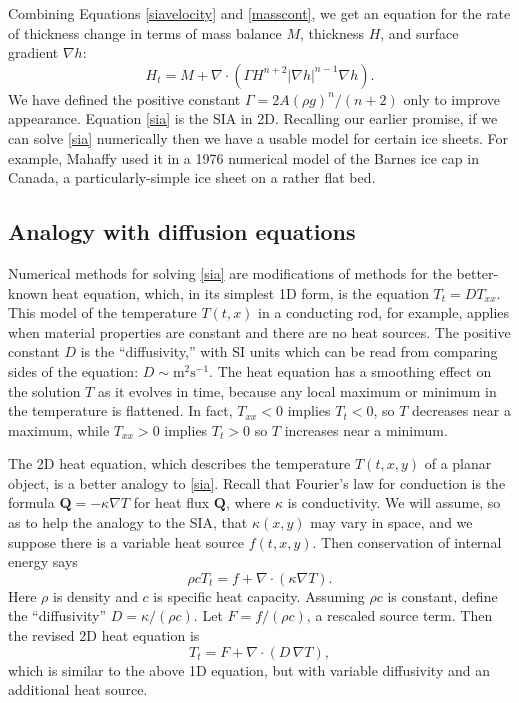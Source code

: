 \documentclass[letterpaper,final,12pt,reqno]{amsart}
\newcommand{\grad}{\nabla}
\newcommand{\Div}{\nabla\cdot}
\begin{document}
Combining Equations \eqref{siavelocity} and \eqref{masscont}, we get an equation for the rate of thickness change in terms of mass balance $M$, thickness $H$, and surface gradient $\grad h$:
\begin{equation}
H_t = M + \Div \left(\Gamma H^{n+2} |\grad h|^{n-1} \grad h \right). \label{sia}
\end{equation}
We have defined the positive constant $\Gamma = 2 A (\rho g)^n / (n+2)$ only to improve appearance.  Equation \eqref{sia} is the SIA in 2D.  Recalling our earlier promise, if we can solve \eqref{sia} numerically then we have a usable model for certain ice sheets.  For example, Mahaffy \cite{Mahaffy} used it in a 1976 numerical model of the Barnes ice cap in Canada, a particularly-simple ice sheet on a rather flat bed.

\subsection*{Analogy with diffusion equations}  Numerical methods for solving \eqref{sia} are modifications of methods for the better-known heat equation, which, in its simplest 1D form, is the equation $T_t = D T_{xx}$.  This model of the temperature $T(t,x)$ in a conducting rod, for example, applies when material properties are constant and there are no heat sources.  The positive constant $D$ is the ``diffusivity,'' with SI units which can be read from comparing sides of the equation: $D\sim \text{m}^2 \text{s}^{-1}$.  The heat equation has a smoothing effect on the solution $T$ as it evolves in time, because any local maximum or minimum in the temperature is flattened.  In fact, $T_{xx}<0$ implies $T_t<0$, so $T$ decreases near a maximum, while $T_{xx}>0$ implies $T_t>0$ so $T$ increases near a minimum.

The 2D heat equation, which describes the temperature $T(t,x,y)$ of a planar object, is a better analogy to \eqref{sia}.  Recall that Fourier's law for conduction is the formula $\mathbf{Q} = - \kappa \grad T$ for heat flux $\mathbf{Q}$, where $\kappa$ is conductivity.  We will assume, so as to help the analogy to the SIA, that $\kappa(x,y)$ may vary in space, and we suppose there is a variable heat source $f(t,x,y)$.  Then conservation of internal energy says
\begin{equation}
\rho c T_t = f + \Div (\kappa \grad T). \label{heatearly}
\end{equation}
Here $\rho$ is density and $c$ is specific heat capacity.  Assuming $\rho c$ is constant, define the ``diffusivity'' $D=\kappa/(\rho c)$.  Let $F = f/(\rho c)$, a rescaled source term.  Then the revised 2D heat equation is
\begin{equation}
T_t = F + \Div (D\, \grad T), \label{heat}
\end{equation}
which is similar to the above 1D equation, but with variable diffusivity and an additional heat source.
\end{document}
